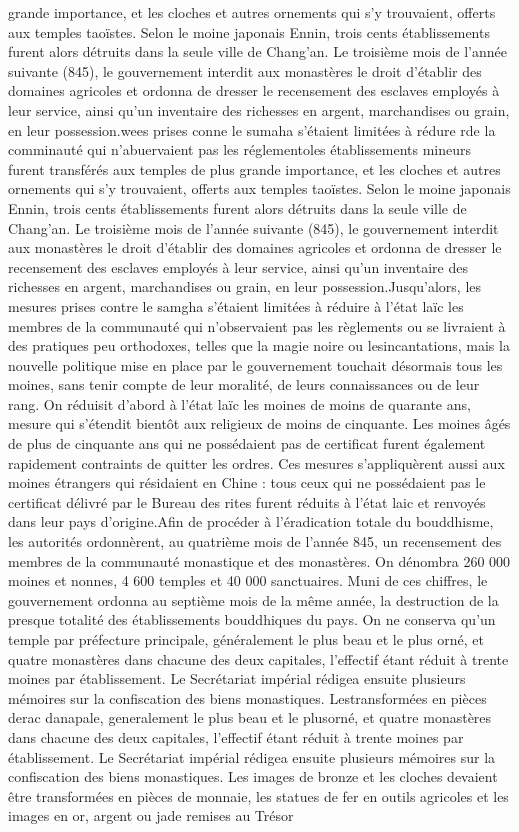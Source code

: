 grande importance, et les cloches et autres ornements qui s'y trouvaient, offerts aux temples taoïstes. Selon le moine japonais Ennin, trois cents établissements furent alors détruits dans la seule ville de Chang'an. Le troisième mois de l'année suivante (845), le gouvernement interdit aux monastères le droit d'établir des domaines agricoles et ordonna de dresser le recensement des esclaves employés à leur service, ainsi qu'un inventaire des richesses en argent, marchandises ou grain, en leur possession.wees prises conne le sumaha s'étaient limitées à rédure rde la comminauté qui n'abuervaient pas les réglementoles établissements mineurs furent transférés aux temples de plus grande importance, et les cloches et autres ornements qui s'y trouvaient, offerts aux temples taoïstes. Selon le moine japonais Ennin, trois cents établissements furent alors détruits dans la seule ville de Chang'an. Le troisième mois de l'année suivante (845), le gouvernement interdit aux monastères le droit d'établir des domaines agricoles et ordonna de dresser le recensement des esclaves employés à leur service, ainsi qu'un inventaire des richesses en argent, marchandises ou grain, en leur possession.Jusqu'alors, les mesures prises contre le samgha s'étaient limitées à réduire à l'état laïc les membres de la communauté qui n'observaient pas les règlements ou se livraient à des pratiques peu orthodoxes, telles que la magie noire ou lesincantations, mais la nouvelle politique mise en place par le gouvernement touchait désormais tous les moines, sans tenir compte de leur moralité, de leurs connaissances ou de leur rang. On réduisit d'abord à l'état laïc les moines de moins de quarante ans, mesure qui s'étendit bientôt aux religieux de moins de cinquante. Les moines âgés de plus de cinquante ans qui ne possédaient pas de certificat furent également rapidement contraints de quitter les ordres. Ces mesures s'appliquèrent aussi aux moines étrangers qui résidaient en Chine : tous ceux qui ne possédaient pas le certificat délivré par le Bureau des rites furent réduits à l'état laic et renvoyés dans leur pays d'origine.Afin de procéder à l'éradication totale du bouddhisme, les autorités ordonnèrent, au quatrième mois de l'année 845, un recensement des membres de la communauté monastique et des monastères. On dénombra 260 000 moines et nonnes, 4 600 temples et 40 000 sanctuaires. Muni de ces chiffres, le gouvernement ordonna au septième mois de la même année, la destruction de la presque totalité des établissements bouddhiques du pays. On ne conserva qu'un temple par préfecture principale, généralement le plus beau et le plus orné, et quatre monastères dans chacune des deux capitales, l'effectif étant réduit à trente moines par établissement. Le Secrétariat impérial rédigea ensuite plusieurs mémoires sur la confiscation des biens monastiques. Lestransformées en pièces derac danapale, generalement le plus beau et le plusorné, et quatre monastères dans chacune des deux capitales, l'effectif étant réduit à trente moines par établissement. Le Secrétariat impérial rédigea ensuite plusieurs mémoires sur la confiscation des biens monastiques. Les images de bronze et les cloches devaient être transformées en pièces de monnaie, les statues de fer en outils agricoles et les images en or, argent ou jade remises au Trésor 